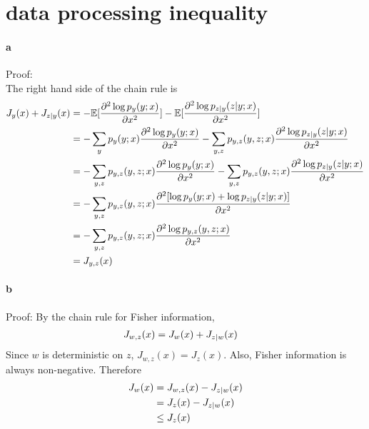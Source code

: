 \documentclass{article}
\begin{document}
\section{data processing inequality}
\paragraph{a}
Proof:\\
The right hand side of the chain rule is
\begin{align}
	J_{y}(x)+J_{z|y}(x)&=-\mathbb{E}[\frac{\partial^2\log p_{y}(y;x)}{\partial x^2}]-\mathbb{E}[\frac{\partial^2\log p_{z|y}(z|y;x)}{\partial x^2}]\notag\\
	&=-\sum_{y}p_{y}(y;x)\frac{\partial^2\log p_{y}(y;x)}{\partial x^2}-\sum_{y,z}p_{y,z}(y,z;x)\frac{\partial^2\log p_{z|y}(z|y;x)}{\partial x^2}\notag\\
	&=-\sum_{y,z}p_{y,z}(y,z;x)\frac{\partial^2\log p_{y}(y;x)}{\partial x^2}-\sum_{y,z}p_{y,z}(y,z;x)\frac{\partial^2\log p_{z|y}(z|y;x)}{\partial x^2}\notag\\
	&=-\sum_{y,z}p_{y,z}(y,z;x)\frac{\partial^2[\log p_{y}(y;x)+\log p_{z|y}(z|y;x)]}{\partial x^2}\notag\\
	&=-\sum_{y,z}p_{y,z}(y,z;x)\frac{\partial^2\log p_{y,z}(y,z;x)}{\partial x^2}\notag\\
	&=J_{y,z}(x)\notag
\end{align}
\paragraph{b}
Proof:
By the chain rule for Fisher information,
\begin{align}
	J_{w,z}(x)&=J_{w}(x)+J_{z|w}(x)\notag
\end{align}
Since $w$ is deterministic on $z$, $J_{w,z}(x)=J_{z}(x)$. Also, Fisher information is always non-negative. Therefore
\begin{align}
	J_{w}(x)&=J_{w,z}(x)-J_{z|w}(x)\notag\\
	&=J_{z}(x)-J_{z|w}(x)\notag\\
	&\le J_{z}(x)\notag
\end{align}
\end{document}
